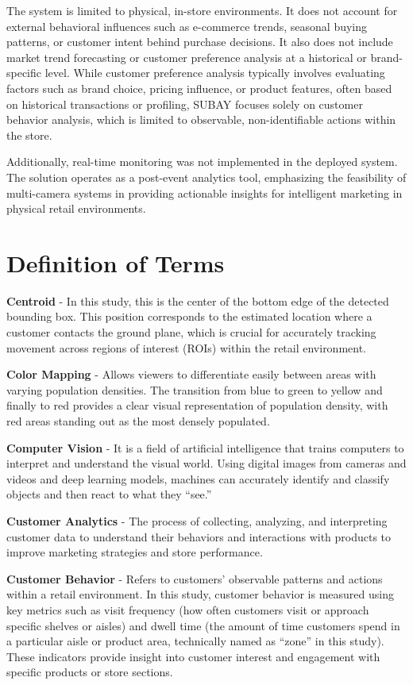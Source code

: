 {The system is limited to physical, in-store environments. It does not account for external behavioral influences such as e-commerce trends, seasonal buying patterns, or customer intent behind purchase decisions. It also does not include market trend forecasting or customer preference analysis at a historical or brand-specific level. While customer preference analysis typically involves evaluating factors such as brand choice, pricing influence, or product features, often based on historical transactions or profiling, SUBAY focuses solely on customer behavior analysis, which is limited to observable, non-identifiable actions within the store.

Additionally, real-time monitoring was not implemented in the deployed system. The solution operates as a post-event analytics tool, emphasizing the feasibility of multi-camera systems in providing actionable insights for intelligent marketing in physical retail environments.

\section{Definition of Terms}

\textbf{Centroid} - In this study, this is the center of the bottom edge of the detected bounding box. This position corresponds to the estimated location where a customer contacts the ground plane, which is crucial for accurately tracking movement across regions of interest (ROIs) within the retail environment.

\textbf{Color Mapping} - Allows viewers to differentiate easily between areas with varying population densities. The transition from blue to green to yellow and finally to red provides a clear visual representation of population density, with red areas standing out as the most densely populated.

\textbf{Computer Vision} - It is a field of artificial intelligence that trains computers to interpret and understand the visual world. Using digital images from cameras and videos and deep learning models, machines can accurately identify and classify objects and then react to what they “see.”

\textbf{Customer Analytics} - The process of collecting, analyzing, and interpreting customer data to understand their behaviors and interactions with products to improve marketing strategies and store performance.

\textbf{Customer Behavior} - Refers to customers' observable patterns and actions within a retail environment. In this study, customer behavior is measured using key metrics such as visit frequency (how often customers visit or approach specific shelves or aisles) and dwell time (the amount of time customers spend in a particular aisle or product area, technically named as “zone” in this study). These indicators provide insight into customer interest and engagement with specific products or store sections.

}
